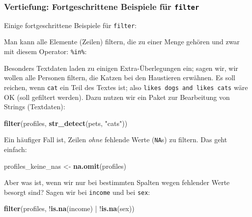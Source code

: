 \documentclass[12pt,ngerman,]{book}
\newenvironment{Shaded}{\begin{snugshade}}{\end{snugshade}}
\newcommand{\KeywordTok}[1]{\textcolor[rgb]{0.13,0.29,0.53}{\textbf{{#1}}}}
\newcommand{\StringTok}[1]{\textcolor[rgb]{0.31,0.60,0.02}{{#1}}}
\newcommand{\NormalTok}[1]{{#1}}
\renewenvironment{Shaded}{\begin{kframe}}{\end{kframe}}
\begin{document}
\subsubsection{\texorpdfstring{Vertiefung: Fortgeschrittene Beispiele
für
\texttt{filter}}{Vertiefung: Fortgeschrittene Beispiele für filter}}\label{vertiefung-fortgeschrittene-beispiele-fur-filter}

Einige fortgeschrittene Beispiele für \texttt{filter}:

Man kann alle Elemente (Zeilen) filtern, die zu einer Menge gehören und
zwar mit diesem Operator: \texttt{\%in\%}:

\begin{Shaded}
\end{Shaded}

Besonders Textdaten laden zu einigen Extra-Überlegungen ein; sagen wir,
wir wollen alle Personen filtern, die Katzen bei den Haustieren
erwähnen. Es soll reichen, wenn \texttt{cat} ein Teil des Textes ist;
also \texttt{likes\ dogs\ and\ likes\ cats} wäre OK (soll gefiltert
werden). Dazu nutzen wir ein Paket zur Bearbeitung von Strings
(Textdaten):

\begin{Shaded}
\begin{Highlighting}[]

\KeywordTok{filter}\NormalTok{(profiles, }\KeywordTok{str_detect}\NormalTok{(pets, }\StringTok{"cats"}\NormalTok{))}
\end{Highlighting}
\end{Shaded}

Ein häufiger Fall ist, Zeilen \emph{ohne} fehlende Werte (\texttt{NA}s)
zu filtern. Das geht einfach:

\begin{Shaded}
\begin{Highlighting}[]
\NormalTok{profiles_keine_nas <-}\StringTok{ }\KeywordTok{na.omit}\NormalTok{(profiles)}
\end{Highlighting}
\end{Shaded}

Aber was ist, wenn wir nur bei bestimmten Spalten wegen fehlender Werte
besorgt sind? Sagen wir bei \texttt{income} und bei \texttt{sex}:

\begin{Shaded}
\begin{Highlighting}[]
\KeywordTok{filter}\NormalTok{(profiles, !}\KeywordTok{is.na}\NormalTok{(income) |}\StringTok{ }\NormalTok{!}\KeywordTok{is.na}\NormalTok{(sex))}
\end{Highlighting}
\end{Shaded}
\end{document}
